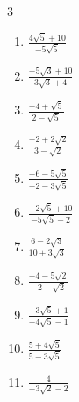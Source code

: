 \begin{multicols}{3}
\begin{enumerate}
\columnbreak %

  \item $\displaystyle \frac{4\sqrt{5}+10}{-5\sqrt{5}}$


  \item $\displaystyle \frac{-5\sqrt{3}+10}{3\sqrt{3}+4}$


  \item $\displaystyle \frac{-4+\sqrt{5}}{2-\sqrt{5}}$


  \item $\displaystyle \frac{-2+2\sqrt{2}}{3-\sqrt{2}}$


  \item $\displaystyle \frac{-6-5\sqrt{5}}{-2-3\sqrt{5}}$


\columnbreak %

\resetques

  \item $\displaystyle \frac{-2\sqrt{5}+10}{-5\sqrt{5}-2}$


  \item $\displaystyle \frac{6-2\sqrt{3}}{10+3\sqrt{3}}$


  \item $\displaystyle \frac{-4-5\sqrt{2}}{-2-\sqrt{2}}$


  \item $\displaystyle \frac{-3\sqrt{5}+1}{-4\sqrt{5}-1}$


  \item $\displaystyle \frac{5+4\sqrt{5}}{5-3\sqrt{5}}$


\columnbreak %

  \item $\displaystyle \frac{4}{-3\sqrt{2}-2}$


\end{enumerate}
\end{multicols}
